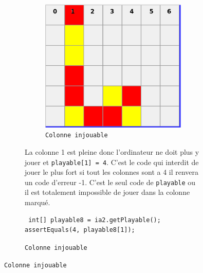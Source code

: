 \begin{figure}[H]
\begin{figure}[H]
\begin{figure}[H]
\begin{center}
  \includegraphics[scale=0.2]{playable4}
  \caption{\texttt{Colonne injouable}}
\end{center}
\end{figure}

La colonne 1 est pleine donc l'ordinateur ne doit plus y jouer et  \texttt{playable[1] = 4}.
C'est le code qui interdit de jouer le plus fort si tout les colonnes sont a 4 il renvera un code d'erreur -1.
C'est le seul code de \texttt{playable}  ou il est totalement impossible de jouer dans la colonne marqué.


\begin{verbatim}
 int[] playable8 = ia2.getPlayable();
assertEquals(4, playable8[1]);
\end{verbatim}



\end{figure}
\end{figure}
